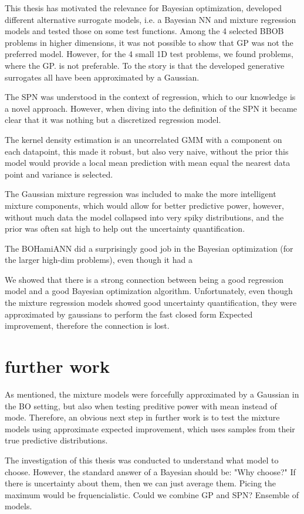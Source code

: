 This thesis has motivated the relevance for Bayesian optimization, developed different alternative
surrogate models, i.e. a Bayesian NN and mixture regression models and tested those on some 
test functions. Among the 4 selected BBOB problems in higher dimensions, it was not possible to show that
GP was not the preferred model. However, for the 4 small 1D test problems, we found problems, where the GP. 
is not preferable. To the story is that the developed generative surrogates all have been approximated by
a Gaussian. 

The SPN was understood in the context of regression, which to our knowledge is a novel approach. However, 
when diving into the definition of the SPN it became clear that it was nothing but a discretized regression model. 

The kernel density estimation is an uncorrelated GMM with a component on each datapoint, this made
it robust, but also very naive, without the prior this model would provide a local mean prediction
with mean equal the nearest data point and variance is selected.

The Gaussian mixture regression was included to make the more intelligent mixture components, which
would allow for better predictive power, however, without much data the model collapsed into very
spiky distributions, and the prior was often sat high to help out the uncertainty quantification. 

The BOHamiANN did a surprisingly good job in the Bayesian optimization (for the larger high-dim problems),
even though it had a 

We showed that there is a strong connection between being a good regression model and a good Bayesian optimization
algorithm. Unfortunately, even though the mixture regression models showed good uncertainty quantification,
they were approximated by gaussians to perform the fast closed form Expected improvement, therefore the 
connection is lost. 

\section{further work}
As mentioned, the mixture models were forcefully approximated by a Gaussian in the BO setting, but also when testing preditive
power with mean instead of mode. Therefore, an obvious next step in further work is to test the mixture models using approximate
expected improvement, which uses samples from their true predictive distributions. 

The investigation of this thesis was conducted to understand what model to choose. However, the standard answer
of a Bayesian should be: "Why choose?" If there is uncertainty about them, then we can just average
them. Picing the maximum would be frquencialistic. Could we combine GP and SPN? Ensemble of models.

